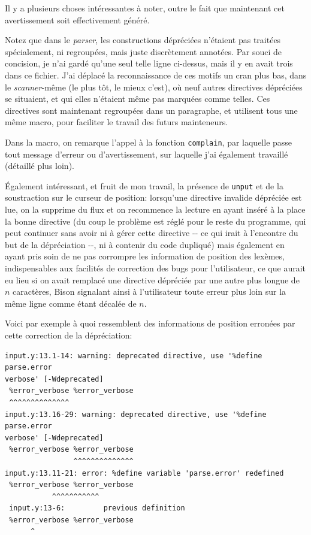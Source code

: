 \documentclass[a4paper,11pt,twoside,final]{article}
\begin{document}
  Il y a plusieurs choses intéressantes à noter, outre le fait que maintenant
  cet avertissement soit effectivement généré.

  Notez que dans le \textit{parser}, les constructions dépréciées n'étaient pas
  traitées spécialement, ni regroupées, mais juste discrètement annotées. Par
  souci de concision, je n'ai gardé qu'une seul telle ligne ci-dessus, mais il
  y en avait trois dans ce fichier. J'ai déplacé la reconnaissance de ces
  motifs un cran plus bas, dans le \textit{scanner}-même (le plus tôt, le
  mieux c'est), où neuf autres directives dépréciées se situaient, et qui elles
  n'étaient même pas marquées comme telles. Ces directives sont maintenant
  regroupées dans un paragraphe, et utilisent tous une même macro, pour
  faciliter le travail des futurs mainteneurs.

  Dans la macro, on remarque l'appel à la fonction \texttt{complain}, par
  laquelle passe tout message d'erreur ou d'avertissement, sur laquelle j'ai
  également travaillé (détaillé plus loin).

  Également intéressant, et fruit de mon travail, la présence de \texttt{unput}
  et de la soustraction sur le curseur de position: lorsqu'une directive
  invalide dépréciée est lue, on la supprime du flux et on recommence la
  lecture en ayant inséré à la place la bonne directive (du coup le problème est
  réglé pour le reste du programme, qui peut continuer sans avoir ni à gérer
  cette directive -{}- ce qui irait à l'encontre du but de la dépréciation
  -{}-, ni à contenir du code dupliqué) mais également en ayant pris soin de ne
  pas corrompre les information de position des lexèmes, indispensables aux
  facilités de correction des bugs pour l'utilisateur, ce que aurait eu lieu si
  on avait remplacé une directive dépréciée par une autre plus longue de $n$
  caractères, Bison signalant ainsi à l'utilisateur toute erreur plus loin sur
  la même ligne comme étant décalée de $n$.

  Voici par exemple à quoi ressemblent des informations de position erronées
  par cette correction de la dépréciation:

  \begin{verbatim}
input.y:13.1-14: warning: deprecated directive, use '%define parse.error
verbose' [-Wdeprecated]
 %error_verbose %error_verbose
 ^^^^^^^^^^^^^^
input.y:13.16-29: warning: deprecated directive, use '%define parse.error
verbose' [-Wdeprecated]
 %error_verbose %error_verbose
                ^^^^^^^^^^^^^^
input.y:13.11-21: error: %define variable 'parse.error' redefined
 %error_verbose %error_verbose
           ^^^^^^^^^^^
 input.y:13-6:         previous definition
 %error_verbose %error_verbose
      ^
  \end{verbatim}
\end{document}

